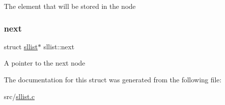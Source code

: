 The element that will be stored in the node \mbox{\label{structsllist_abd84069b1b074a7ac7d94b65672d4fd3}} 
\subsubsection{\texorpdfstring{next}{next}}
{\footnotesize\ttfamily struct \hyperlink{structsllist}{sllist}$\ast$ sllist\+::next}

A pointer to the next node 

The documentation for this struct was generated from the following file\+:\begin{DoxyCompactItemize}
\item 
src/\hyperlink{sllist_8c}{sllist.\+c}\end{DoxyCompactItemize}
